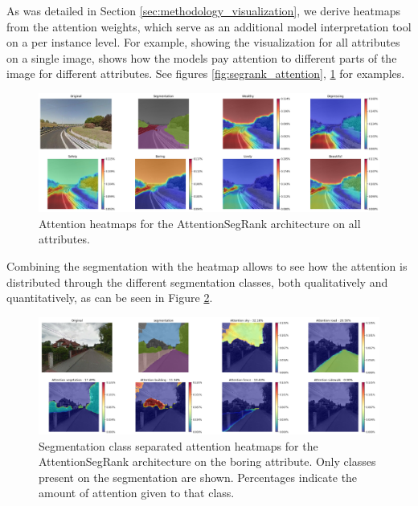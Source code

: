 As was detailed in Section \ref{sec:methodology_visualization}, we  derive heatmaps
from the attention weights, which serve as an additional model interpretation
tool on a per instance level. For example, showing the visualization for all attributes on
a single image, shows how the models pay attention to different parts of the image for different
attributes. See figures \ref{fig:segrank_attention}, \ref{fig:vis_sample} for examples.

\begin{figure}[ht]
	\begin{center}
	\includegraphics[width=1\textwidth]{./figures/vis_samples(seg_attn).png}
	\caption[Multi attribute Visualization Sample]{
        Attention heatmaps for the AttentionSegRank architecture on all attributes.
        }
	\label{fig:vis_sample}
	\end{center}
\end{figure}

Combining the segmentation with the heatmap allows to see how the attention is distributed
through the different segmentation classes, both qualitatively and quantitatively, as can
be seen in Figure \ref{fig:object_attention}.

\begin{figure}[ht]
	\begin{center}
	\includegraphics[width=1\textwidth]{./figures/object_attention.png}
	\caption[Attention by segmentation class heatmaps.]{
		Segmentation class separated attention heatmaps for the AttentionSegRank architecture on the boring attribute.
		Only classes present on the segmentation are shown. Percentages indicate the amount of attention given to that
		class.
        }
	\label{fig:object_attention}
	\end{center}
\end{figure}

